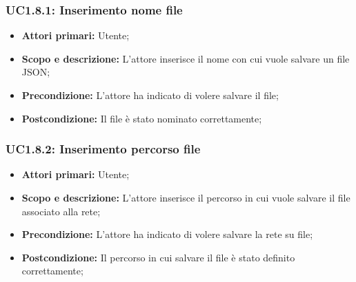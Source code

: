 \subsubsection{UC1.8.1: Inserimento nome file} 
\begin{itemize} 
	\item{\textbf{Attori primari:} Utente;} 
	\item{\textbf{Scopo e descrizione:} L'attore inserisce il nome con cui vuole salvare un file JSON;} 
	\item{\textbf{Precondizione:} L'attore ha indicato di volere salvare il file;} 
	\item{\textbf{Postcondizione:} Il file è stato nominato correttamente;} 
\end{itemize} 
\subsubsection{UC1.8.2: Inserimento percorso file} 
\begin{itemize} 
	\item{\textbf{Attori primari:} Utente;} 
	\item{\textbf{Scopo e descrizione:} L'attore inserisce il percorso in cui vuole salvare il file associato alla rete;} 
	\item{\textbf{Precondizione:} L'attore ha indicato di volere salvare la rete su file;} 
	\item{\textbf{Postcondizione:} Il percorso in cui salvare il file è stato definito correttamente;} 
\end{itemize} 
